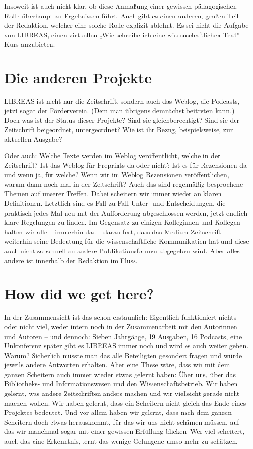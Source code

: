 \documentclass[output=paper]{langscibook}
\begin{document}
Insoweit ist auch nicht klar, ob diese Anmaßung einer gewissen pädagogischen Rolle überhaupt zu Ergebnissen führt. Auch gibt es einen anderen, großen Teil der Redaktion, welcher eine solche Rolle explizit ablehnt. Es sei nicht die Aufgabe von LIBREAS, einen virtuellen „Wie schreibe ich eine wissenschaftlichen Text”-Kurs anzubieten.

\section*{Die anderen Projekte}\label{Die anderen Projekte}

LIBREAS ist nicht nur die Zeitschrift, sondern auch das Weblog, die Podcasts, jetzt sogar der Förderverein. (Dem man übrigens demnächst beitreten kann.) Doch was ist der Status dieser Projekte? Sind sie gleichberechtigt? Sind sie der Zeitschrift beigeordnet, untergeordnet? Wie ist ihr Bezug, beispielsweise, zur aktuellen Ausgabe?

Oder auch: Welche Texte werden im Weblog veröffentlicht, welche in der Zeitschrift? Ist das Weblog für Preprints da oder nicht? Ist es für Rezensionen da und wenn ja, für welche? Wenn wir im Weblog Rezensionen veröffentlichen, warum dann noch mal in der Zeitschrift? Auch das sind regelmäßig besprochene Themen auf unserer Treffen. Dabei scheitern wir immer wieder an klaren Definitionen. Letztlich sind es Fall-zu-Fall-Unter- und Entscheidungen, die praktisch jedes Mal neu mit der Aufforderung abgeschlossen werden, jetzt endlich klare Regelungen zu finden. Im Gegensatz zu einigen Kolleginnen und Kollegen halten wir alle – immerhin das – daran fest, dass das Medium Zeitschrift weiterhin seine Bedeutung für die wissenschaftliche Kommunikation hat und diese auch nicht so schnell an andere Publikationsformen abgegeben wird. Aber alles andere ist innerhalb der Redaktion im Fluss.

\section*{How did we get here?}\label{How did we get here?}

In der Zusammensicht ist das schon erstaunlich: Eigentlich funktioniert nichts oder nicht viel, weder intern noch in der Zusammenarbeit mit den Autorinnen und Autoren – und dennoch: Sieben Jahrgänge, 19 Ausgaben, 16 Podcasts, eine Unkonferenz später gibt es LIBREAS immer noch und wird es auch weiter geben. Warum? Sicherlich müsste man das alle Beteiligten gesondert fragen und würde jeweils andere Antworten erhalten. Aber eine These wäre, dass wir mit dem ganzen Scheitern auch immer wieder etwas gelernt haben: Über uns, über das Bibliotheks- und Informationswesen und den Wissenschaftsbetrieb. Wir haben gelernt, was andere Zeitschriften anders machen und wir vielleicht gerade nicht machen wollen. Wir haben gelernt, dass ein Scheitern nicht gleich das Ende eines Projektes bedeutet. Und vor allem haben wir gelernt, dass nach dem ganzen Scheitern doch etwas herauskommt, für das wir uns nicht schämen müssen, auf das wir manchmal sogar mit einer gewissen Erfüllung blicken. Wer viel scheitert, auch das eine Erkenntnis, lernt das wenige Gelungene umso mehr zu schätzen.
\end{document}

